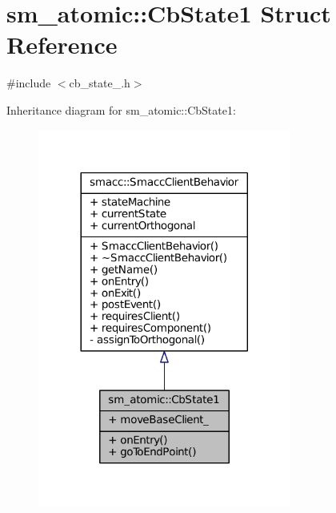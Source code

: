 \hypertarget{structsm__atomic_1_1CbState1}{}\section{sm\+\_\+atomic\+:\+:Cb\+State1 Struct Reference}
\label{structsm__atomic_1_1CbState1}


{\ttfamily \#include $<$cb\+\_\+state\+\_.\+h$>$}



Inheritance diagram for sm\+\_\+atomic\+:\+:Cb\+State1\+:
\nopagebreak
\begin{figure}[H]
\begin{center}
\leavevmode
\includegraphics[width=236pt]{structsm__atomic_1_1CbState1__inherit__graph}
\end{center}
\end{figure}


